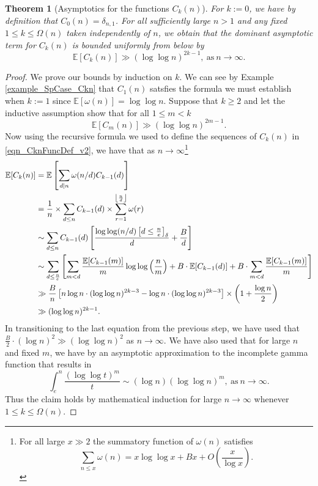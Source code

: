 \documentclass[11pt,reqno,a4letter]{article}
\numberwithin{figure}{section}
\numberwithin{table}{section}
\newcommand{\Iverson}[1]{\ensuremath{\left[#1\right]_{\delta}}}
\newcommand{\Floor}[2]{\ensuremath{\left\lfloor \frac{#1}{#2} \right\rfloor}}
\theoremstyle{plain}
\newtheorem{theorem}{Theorem}
\numberwithin{theorem}{section}
\theoremstyle{definition}
\newcommand{\NBRef}[1]{}
\begin{document}
\begin{theorem}[Asymptotics for the functions $C_k(n)$] 
\label{theorem_Ckn_GeneralAsymptoticsForms} 
For $k := 0$, we have by definition that $C_0(n) = \delta_{n,1}$. 
For all sufficiently large $n > 1$ and any fixed $1 \leq k \leq \Omega(n)$ 
taken independently of $n$, 
we obtain that the dominant asymptotic term for $C_k(n)$ is bounded uniformly from below by 
\[
\mathbb{E}[C_k(n)] \gg (\log\log n)^{2k-1}, \mathrm{\ as\ }n \rightarrow \infty. 
\]
\end{theorem} 
\NBRef{A08-2020-04-26} 
\begin{proof} 
\label{proofOf_theorem_Ckn_GeneralAsymptoticsForms} 
We prove our bounds by induction on $k$. 
We can see by Example \ref{example_SpCase_Ckn} that $C_1(n)$ 
satsfies the formula we must establish when $k := 1$ since $\mathbb{E}[\omega(n)] = \log\log n$. 
Suppose that $k \geq 2$ and let the inductive assumption show that for all $1 \leq m < k$ 
\[
\mathbb{E}[C_m(n)] \gg (\log\log n)^{2m-1}. 
\] 
Now using the recursive formula we used to define the sequences of $C_k(n)$ in 
\eqref{eqn_CknFuncDef_v2}, we have that as $n \rightarrow \infty$\footnote{ 
     For all large $x \gg 2$ the summatory function of $\omega(n)$ satisfies 
     \cite[\S 22.10]{HARDYWRIGHT} 
     \[
     \sum_{n \leq x} \omega(n) = x \log\log x + Bx + O\left(\frac{x}{\log x}\right). 
     \]
}
\begin{align} 
\notag
\mathbb{E}[C_k(n)] & = \mathbb{E}\left[\sum_{d|n} \omega(n/d) C_{k-1}(d)\right] \\ 
\notag 
     & = \frac{1}{n} \times \sum_{d \leq n} C_{k-1}(d) \times \sum_{r=1}^{\Floor{n}{d}} \omega(r) \\ 
\notag 
     & \sim \sum_{d \leq n} C_{k-1}(d) \left[ 
     \frac{\log\log(n/d) \Iverson{d \leq \frac{n}{e}}}{d} + \frac{B}{d}\right] \\ 
\label{eqn_proof_tag_ECkn_sum_steps_v3} 
     & \sim \sum_{d \leq \frac{n}{e}} \left[ 
     \sum_{m < d} \frac{\mathbb{E}[C_{k-1}(m)]}{m} \log\log\left(\frac{n}{m}\right) + 
     B \cdot \mathbb{E}[C_{k-1}(d)] + B \cdot \sum_{m < d} \frac{\mathbb{E}[C_{k-1}(m)]}{m} 
     \right] \\ 
\notag 
     & \gg \frac{B}{n} \left[n \log n \cdot (\log\log n)^{2k-3} - \log n \cdot (\log\log n)^{2k-3}\right] \times 
     \left(1 + \frac{\log n}{2}\right) \\ 
\notag 
     & \gg (\log\log n)^{2k-1}. 
\end{align} 
In transitioning to the last equation from the previous step, we have used that 
$\frac{B}{2} \cdot (\log n)^2 \gg (\log\log n)^2$ as $n \rightarrow \infty$. We have also used that for large 
$n$ and fixed $m$, we have by an asymptotic approximation to the incomplete gamma function that results in 
\[
\int_{e}^{n} \frac{(\log\log t)^m}{t} \sim (\log n) (\log\log n)^{m}, 
     \mathrm{\ as\ } n \rightarrow \infty. 
\]
Thus the claim holds by mathematical induction for large $n \rightarrow \infty$ whenever 
$1 \leq k \leq \Omega(n)$. 
\end{proof} 
\end{document}
